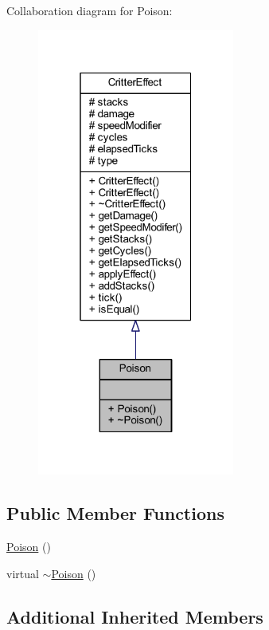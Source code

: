 Collaboration diagram for Poison\+:
\nopagebreak
\begin{figure}[H]
\begin{center}
\leavevmode
\includegraphics[width=184pt]{struct_poison__coll__graph}
\end{center}
\end{figure}
\subsection*{Public Member Functions}
\begin{DoxyCompactItemize}
\item 
\hyperlink{struct_poison_aab6ccb2536a87ae8d9204168f0da0f66}{Poison} ()
\item 
virtual \hyperlink{struct_poison_ad296dc6dd102fb118ad5895d37af0fdd}{$\sim$\+Poison} ()
\end{DoxyCompactItemize}
\subsection*{Additional Inherited Members}


